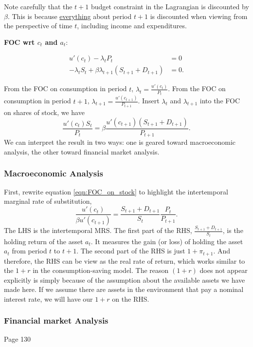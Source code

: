 \documentclass[10pt]{article}
\begin{document}
Note carefully that the $ t + 1 $ budget constraint in the Lagrangian is discounted by $ \beta $.
This is because {\underline {everything}} about period $ t + 1 $ is discounted when viewing from
the perspective of time $ t $, including income and expenditures.

{\textbf {FOC wrt $ c_{t} $ and $ a_{t} $}}:

\begin{align*}
u'(c_{t}) - \lambda_{t}P_{t}&= 0\\
 - \lambda_{t}S_{t} + \beta \lambda_{t + 1}(S_{t + 1} + D_{t + 1})&= 0.
\end{align*}

From the FOC on consumption in period $ t $, $ \lambda_{t} = \frac{u'(c_{t})}{P_{t}} $.
From the FOC on consumption in period $ t + 1 $, $ \lambda_{t + 1} = \frac{u'(c_{t + 1})}{P_{t + 1}} $.
Insert $ \lambda_{t} $ and $ \lambda_{t + 1} $ into the FOC on shares of stock, we have
\begin{equation}
\frac{u'(c_{t})S_{t}}{P_{t}} = \beta \frac{u'(c_{t + 1})(S_{t + 1} + D_{t + 1})}{P_{t + 1}}.
\label{eqn:FOC_on_stock}
\end{equation}
We can interpret the result in two ways: one is geared toward macroeconomic analysis, the other 
toward financial market analysis.

\subsubsection{Macroeconomic Analysis}
First, rewrite equation \eqref{eqn:FOC_on_stock} to highlight the intertemporal marginal rate of 
substitution,
\begin{equation*}
\frac{u'(c_{t})}{\beta u'(c_{t + 1})} = \frac{S_{t + 1} + D_{t + 1}}{S_{t}}
\frac{P_{t}}{P_{t + 1}}.
\end{equation*}
The LHS is the intertemporal MRS. The first part of the RHS, $ \frac{S_{t + 1} + D_{t + 1}}{S_{t}} $,
is the holding return of the asset $ a_{t} $.
It measures the gain (or loss) of holding the asset $ a_{t} $ from period $ t $ to $ t + 1 $.
The second part of the RHS is just $ 1 + \pi_{t + 1} $. And therefore, the RHS can be view as the
real rate of return, which works similar to the $ 1 + r $ in the consumption-saving model.
The reason $ (1 + r) $ does not appear explicitly is simply because of the assumption about the
available assets we have made here. If we assume there are assets in the environment that pay
a nominal interest rate, we will have our $ 1 + r $ on the RHS.
\subsubsection{Financial market Analysis}
Page 130
\end{document}
